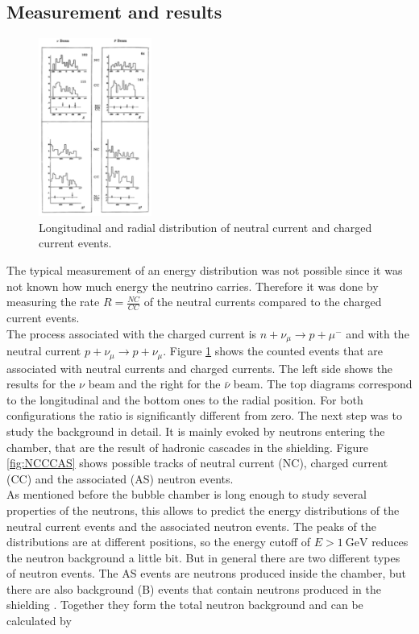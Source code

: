 \subsection{Measurement and results}
\begin{figure}
    \includegraphics[width=0.33\textwidth]{graphics/CC_NC.png}
    \caption{Longitudinal and radial distribution of neutral current and charged current events.\cite{NC}}
		\label{fig:NCCC}
  \end{figure}
  \FloatBarrier
The typical measurement of an energy distribution was not possible since it was not known how much energy the neutrino carries. Therefore it was done by measuring the rate $R=\frac{NC}{CC}$ of the neutral currents compared to the charged current events.\\
The process associated with the charged current is $n + \nu_{\mu} \rightarrow p + \mu^{-}$ and with the neutral current $p + \nu_{\mu} \rightarrow p + \nu_{\mu}$.
Figure \ref{fig:NCCC} shows the counted events that are associated with neutral currents and charged currents. The left side shows the results for the $\nu$ beam and the right for the $\bar{\nu}$ beam. The top diagrams correspond to the longitudinal and the bottom ones to the radial position. For both configurations the ratio is significantly different from zero. The next step was to study the background in detail. It is mainly evoked by neutrons entering the chamber, that are the result of hadronic cascades in the shielding. Figure \ref{fig:NCCCAS} shows possible tracks of neutral current (NC), charged current (CC) and the associated (AS) neutron events.\\
As mentioned before the bubble chamber is long enough to study several properties of the neutrons, this allows to predict the energy distributions of the neutral current events and the associated neutron events. The peaks of the distributions are at different positions, so the energy cutoff of $E>\SI{1}{\giga\electronvolt}$ reduces the neutron background a little bit. But in general there are two different types of neutron events. The AS events are neutrons produced inside the chamber, but there are also background (B) events that contain neutrons produced in the shielding \cite{NC_J}. Together they form the total neutron background and can be calculated by
